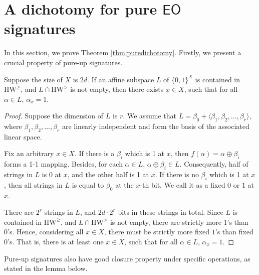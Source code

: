 \documentclass[a4paper,UKenglish,cleveref, autoref, thm-restate]{lipics-v2021}
\newcommand{\eo}[0]{\textsf{EO}}
\newcommand{\eog}[0]{\text{HW}^\geq}
\newcommand{\hw}[1]{\text{HW}^{#1}}
\begin{document}
\section{A dichotomy for pure $\eo$ signatures} \label{section:allup}


In this section, we prove Theorem \ref{thm:puredichotomy}. Firstly, we present a crucial property of pure-up signatures.

\begin{lemma} \label{lem:alluphasdelta1}
Suppose the size of $X$ is $2d$. If an affine subspace $L$ of $\{0,1\}^X$ is contained in $\eog$, and $L \cap \hw{>}$ is not empty, then there exists $x \in X$, such that for all $\alpha \in L$, $\alpha_x=1$. 
\end{lemma}

\begin{proof}
Suppose the dimension of $L$ is $r$. We assume that $L=\beta_0+ \langle \beta_1, \beta_2, \ldots, \beta_r \rangle$, where $\beta_1, \beta_2, \ldots, \beta_r$ are linearly independent and form the basis of the associated linear space.    

Fix an arbitrary $x \in X$. 
If there is a $\beta_i$ which is 1 at $x$, then $f(\alpha)=\alpha\oplus\beta_i$ forms a 1-1 mapping. Besides, for each $\alpha\in L$, $\alpha\oplus\beta_i\in L$. Consequently, half of strings in $L$ is 0 at $x$, and the other half is 1 at $x$.
If there is no $\beta_i$ which is 1 at $x$, then all strings in $L$ is equal to $\beta_0$ at the $x$-th bit. We call it as a fixed $0$ or $1$ at $x$.


There are $2^r$ strings in $L$, and $2d \cdot 2^r$ bits in these strings in total. Since $L$ is contained in $\eog$, and $L \cap \hw{>}$ is not empty, there are strictly more 1's than 0's. 
Hence, considering all $x\in X$, there must be strictly more fixed $1$'s than fixed 0's. That is, there is at least one $x\in X$, such that for all $\alpha\in L$, $\alpha_x=1$. 
\end{proof}

 

Pure-up signatures also have good closure property under specific operations, as stated in the lemma below.
\end{document}
